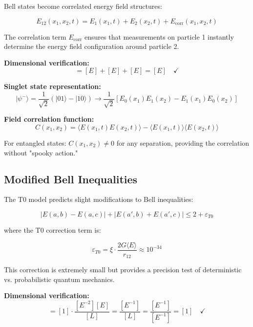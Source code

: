 \documentclass[12pt,a4paper]{report}
\begin{document}
Bell states become correlated energy field structures:

\begin{equation}
	E_{12}(x_1,x_2,t) = E_1(x_1,t) + E_2(x_2,t) + E_{\text{corr}}(x_1,x_2,t)
\end{equation}

The correlation term $E_{\text{corr}}$ ensures that measurements on particle 1 instantly determine the energy field configuration around particle 2.

\textbf{Dimensional verification:}
\begin{equation}
	[E_{12}] = [E] + [E] + [E] = [E] \quad \checkmark
\end{equation}

\textbf{Singlet state representation:}
\begin{equation}
	|\psi^-\rangle = \frac{1}{\sqrt{2}}(|01\rangle - |10\rangle) \rightarrow \frac{1}{\sqrt{2}}[E_0(x_1)E_1(x_2) - E_1(x_1)E_0(x_2)]
\end{equation}

\textbf{Field correlation function:}
\begin{equation}
	C(x_1,x_2) = \langle E(x_1,t) E(x_2,t) \rangle - \langle E(x_1,t) \rangle \langle E(x_2,t) \rangle
\end{equation}

For entangled states: $C(x_1,x_2) \neq 0$ for any separation, providing the correlation without "spooky action."

\subsection{Modified Bell Inequalities}
\label{subsec:modified_bell_inequalities}

The T0 model predicts slight modifications to Bell inequalities:

\begin{equation}
	|E(a,b) - E(a,c)| + |E(a',b) + E(a',c)| \leq 2 + \varepsilon_{T0}
\end{equation}

where the T0 correction term is:

\begin{equation}
	\varepsilon_{T0} = \xi \cdot \frac{2G\langle E \rangle}{r_{12}} \approx 10^{-34}
\end{equation}

This correction is extremely small but provides a precision test of deterministic vs. probabilistic quantum mechanics.

\textbf{Dimensional verification:}
\begin{equation}
	[\varepsilon_{T0}] = [1] \cdot \frac{[E^{-2}][E]}{[L]} = \frac{[E^{-1}]}{[L]} = \frac{[E^{-1}]}{[E^{-1}]} = [1] \quad \checkmark
\end{equation}
\end{document}
